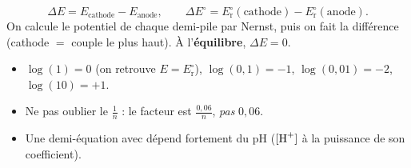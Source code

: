 \documentclass[11pt,a4paper]{article}
\begin{document}
\begin{cle}
\[
\Delta E=E_{\text{cathode}}-E_{\text{anode}},\qquad
\Delta E^{\circ}=E_{\mathrm{r}}^{\circ}(\text{cathode})-E_{\mathrm{r}}^{\circ}(\text{anode}).
\]
On calcule le potentiel de chaque demi-pile par Nernst, puis on fait la différence
(cathode $=$ couple le plus haut). À l'\textbf{équilibre}, $\Delta E=0$.
\end{cle}

\begin{piege}
\begin{itemize}[leftmargin=1.5em,topsep=1pt,itemsep=0pt]
  \item $\log(1)=0$ (on retrouve $E=E_{\mathrm{r}}^{\circ}$), $\log(0{,}1)=-1$, $\log(0{,}01)=-2$,
        $\log(10)=+1$.
  \item Ne pas oublier le $\tfrac{1}{n}$ : le facteur est $\tfrac{0{,}06}{n}$, \emph{pas} $0{,}06$.
  \item Une demi-équation avec  dépend fortement du pH ($[\ce{H+}]$ à la puissance de son
        coefficient).
\end{itemize}
\end{piege}
\end{document}
